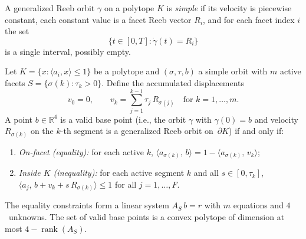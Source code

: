 
\begin{definition}\label{def:simple-reeb-orbit}
A generalized Reeb orbit $\gamma$ on a polytope $K$ is \emph{simple} if
its velocity is piecewise constant, each constant value is a facet Reeb
vector $R_i$, and for each facet index $i$ the set
\[
  \{ t \in [0,T] : \dot{\gamma}(t) = R_i \}
\]
is a single interval, possibly empty.
\end{definition}

\begin{lemma}\label{lem:base-point-recovery}
Let $K = \{x : \langle a_i, x \rangle \leq 1\}$ be a polytope
and $(\sigma, \tau, b)$ a simple orbit
with $m$ active facets
$S = \{\sigma(k) : \tau_k > 0\}$.
Define the accumulated displacements
\[
  v_0 = 0, \qquad
  v_k = \sum_{j=1}^{k-1} \tau_j\, R_{\sigma(j)}
  \quad \text{for } k = 1, \ldots, m.
\]
A point $b \in \mathbb{R}^4$ is a valid base point
(i.e., the orbit $\gamma$ with $\gamma(0) = b$ and
velocity $R_{\sigma(k)}$ on the $k$-th segment
is a generalized Reeb orbit on~$\partial K$) if and only if:
\begin{enumerate}
\item \emph{On-facet (equality):}
  for each active $k$,
  $\langle a_{\sigma(k)},\, b \rangle
    = 1 - \langle a_{\sigma(k)},\, v_k \rangle$;
\item \emph{Inside $K$ (inequality):}
  for each active segment $k$ and all $s \in [0, \tau_k]$,
  $\langle a_j,\, b + v_k + s\, R_{\sigma(k)} \rangle
    \leq 1$ for all $j = 1, \ldots, F$.
\end{enumerate}
The equality constraints form
a linear system $A_S\, b = r$ with $m$ equations and $4$~unknowns.
The set of valid base points is a convex polytope of
dimension at most $4 - \operatorname{rank}(A_S)$.
\end{lemma}

